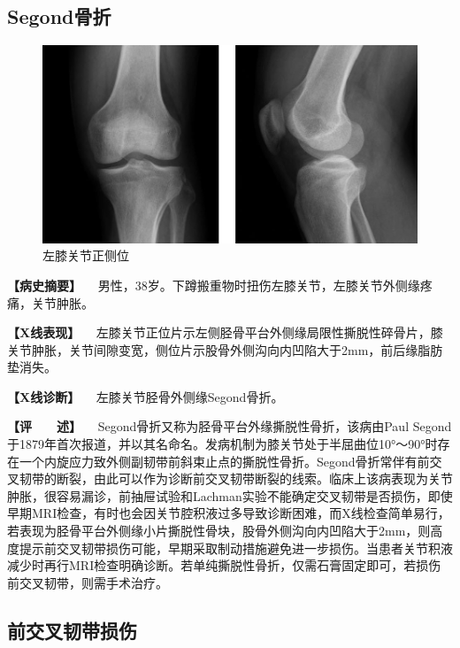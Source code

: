 \subsection{Segond骨折}

\begin{figure}[!htbp]
 \centering
 \includegraphics{./images/Image00048.jpg}
 \captionsetup{justification=centering}
 \caption{左膝关节正侧位}
 \label{fig2-3-21}
  \end{figure} 

\textbf{【病史摘要】}
　男性，38岁。下蹲搬重物时扭伤左膝关节，左膝关节外侧缘疼痛，关节肿胀。

\textbf{【X线表现】}
　左膝关节正位片示左侧胫骨平台外侧缘局限性撕脱性碎骨片，膝关节肿胀，关节间隙变宽，侧位片示股骨外侧沟向内凹陷大于2mm，前后缘脂肪垫消失。

\textbf{【X线诊断】} 　左膝关节胫骨外侧缘Segond骨折。

\textbf{【评　　述】}
　Segond骨折又称为胫骨平台外缘撕脱性骨折，该病由Paul
Segond于1879年首次报道，并以其名命名。发病机制为膝关节处于半屈曲位10°～90°时存在一个内旋应力致外侧副韧带前斜束止点的撕脱性骨折。Segond骨折常伴有前交叉韧带的断裂，由此可以作为诊断前交叉韧带断裂的线索。临床上该病表现为关节肿胀，很容易漏诊，前抽屉试验和Lachman实验不能确定交叉韧带是否损伤，即使早期MRI检查，有时也会因关节腔积液过多导致诊断困难，而X线检查简单易行，若表现为胫骨平台外侧缘小片撕脱性骨块，股骨外侧沟向内凹陷大于2mm，则高度提示前交叉韧带损伤可能，早期采取制动措施避免进一步损伤。当患者关节积液减少时再行MRI检查明确诊断。若单纯撕脱性骨折，仅需石膏固定即可，若损伤前交叉韧带，则需手术治疗。

\subsection{前交叉韧带损伤}

